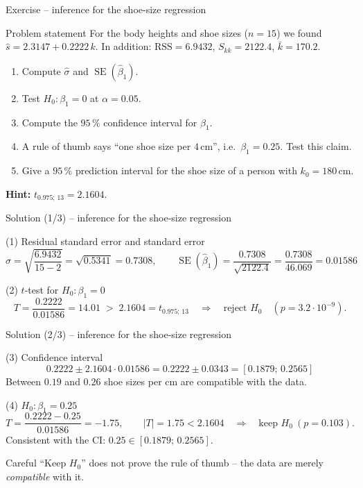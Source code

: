 \documentclass[aspectratio=169,11pt]{beamer}
\begin{document}
\begin{frame}{Exercise -- inference for the shoe-size regression}
  \begin{block}{Problem statement}
    For the body heights and shoe sizes ($n=15$) we found
    $\hat s=2.3147+0.2222\,k$. In addition: $\text{RSS}=6.9432$,
    $S_{kk}=2122.4$, $\bar k=170.2$.
    \begin{enumerate}
      \item Compute $\hat\sigma$ and $\operatorname{SE}(\hat\beta_1)$.
      \item Test $H_0:\beta_1=0$ at $\alpha=0.05$.
      \item Compute the $95\,\%$ confidence interval for $\beta_1$.
      \item A rule of thumb says ``one shoe size per $4\,$cm'', i.e.\
            $\beta_1=0.25$. Test this claim.
      \item Give a $95\,\%$ prediction interval for the shoe size of a
            person with $k_0=180\,$cm.
    \end{enumerate}
  \end{block}
  \textbf{Hint:} $t_{0.975;\,13}=2.1604$.
\end{frame}

\begin{frame}{Solution (1/3) -- inference for the shoe-size regression}
  \begin{exampleblock}{(1) Residual standard error and standard error}
    \[
      \hat\sigma=\sqrt{\frac{6.9432}{15-2}}=\sqrt{0.5341}=0.7308,
      \qquad
      \operatorname{SE}(\hat\beta_1)=\frac{0.7308}{\sqrt{2122.4}}=\frac{0.7308}{46.069}=0.01586
    \]
  \end{exampleblock}
  \begin{exampleblock}{(2) $t$-test for $H_0:\beta_1=0$}
    \[
      T=\frac{0.2222}{0.01586}=14.01\;>\;2.1604=t_{0.975;\,13}
      \quad\Rightarrow\quad \text{reject } H_0 \quad (p=3.2\cdot10^{-9}).
    \]
  \end{exampleblock}
\end{frame}

\begin{frame}{Solution (2/3) -- inference for the shoe-size regression}
  \begin{exampleblock}{(3) Confidence interval}
    \[
      0.2222\pm2.1604\cdot0.01586=0.2222\pm0.0343=\mathbf{[0.1879;\,0.2565]}
    \]
    Between $0.19$ and $0.26$ shoe sizes per cm are compatible with the data.
  \end{exampleblock}
  \begin{exampleblock}{(4) $H_0:\beta_1=0.25$}
    \[
      T=\frac{0.2222-0.25}{0.01586}=-1.75,\qquad |T|=1.75<2.1604
      \quad\Rightarrow\quad\text{keep } H_0\ (p=0.103).
    \]
    Consistent with the CI: $0.25\in[0.1879;\,0.2565]$.
  \end{exampleblock}
  \begin{alertblock}{Careful}
    ``Keep $H_0$'' does not prove the rule of thumb -- the data are merely
    \emph{compatible} with it.
  \end{alertblock}
\end{frame}
\end{document}
